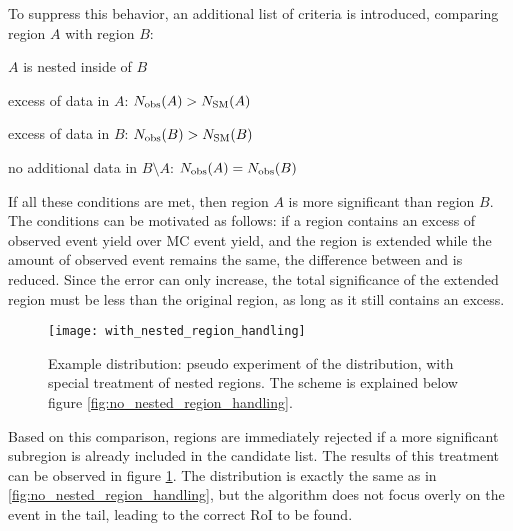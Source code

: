 To suppress this behavior, an additional list of criteria is introduced, comparing region $A$ with region $B$:
\begin{my_list}
	\item $A$ is nested inside of $B$
	\item excess of data in $A$: ${N_\mathrm{obs}}(A) > {N_\mathrm{SM}}(A)$
	\item excess of data in $B$: ${N_\mathrm{obs}}(B) > {N_\mathrm{SM}}(B)$
	\item no additional data in $B \setminus A$: ${N_\mathrm{obs}}(A) = {N_\mathrm{obs}}(B)$
\end{my_list}
If all these conditions are met, then region $A$ is more significant than region $B$.
The conditions can be motivated as follows: if a region contains an excess of observed event yield over MC event yield, and the region is extended while the amount of observed event remains the same, the difference between \Nmc and \Ndata is reduced. Since the error \sigmamc can only increase, the total significance of the extended region must be less than the original region, as long as it still contains an excess.

\begin{figure}[htb]
	\centering
	\texttt{[image: with\_nested\_region\_handling]}
	\caption{Example distribution: pseudo experiment of the  \sumpT distribution, with special treatment of nested regions. The scheme is explained below figure \ref{fig:no_nested_region_handling}. }
	\label{fig:with_nested_region_handling}
\end{figure}
Based on this comparison, regions are immediately rejected if a more significant subregion is already included in the candidate list. The results of this treatment can be observed in figure \ref{fig:with_nested_region_handling}. The distribution is exactly the same as in \ref{fig:no_nested_region_handling}, but the algorithm does not focus overly on the event in the tail, leading to the correct RoI to be found.

